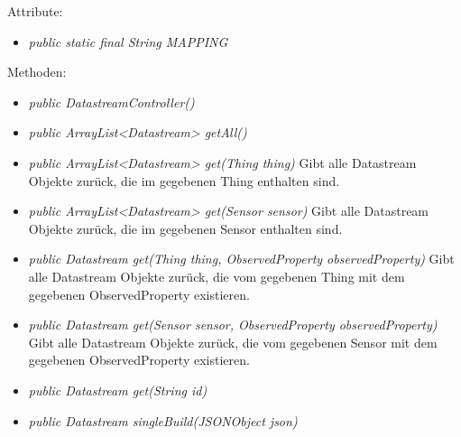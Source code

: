 Attribute:
\begin{itemize}
    \item \emph{public static final String MAPPING} \mappingDescription
\end{itemize}
Methoden:
\begin{itemize}
    \item \emph{public DatastreamController()}
    \item \emph{public ArrayList<Datastream> getAll()}
    \extendsSensorthingController
    \item \emph{public ArrayList<Datastream> get(Thing thing)}
    Gibt alle Datastream Objekte zurück, die im gegebenen Thing enthalten sind.
    \item \emph{public ArrayList<Datastream> get(Sensor sensor)}
    Gibt alle Datastream Objekte zurück, die im gegebenen Sensor enthalten sind.
    \item \emph{public Datastream get(Thing thing, ObservedProperty observedProperty)}
    Gibt alle Datastream Objekte zurück, die vom gegebenen Thing mit dem gegebenen ObservedProperty existieren.
    \item \emph{public Datastream get(Sensor sensor, ObservedProperty observedProperty)}
    Gibt alle Datastream Objekte zurück, die vom gegebenen Sensor mit dem gegebenen ObservedProperty existieren.
    \item \emph{public Datastream get(String id)}
    \extendsSensorthingController
    \item \emph{public Datastream singleBuild(JSONObject json)}
    \extendsSensorthingController
\end{itemize}

